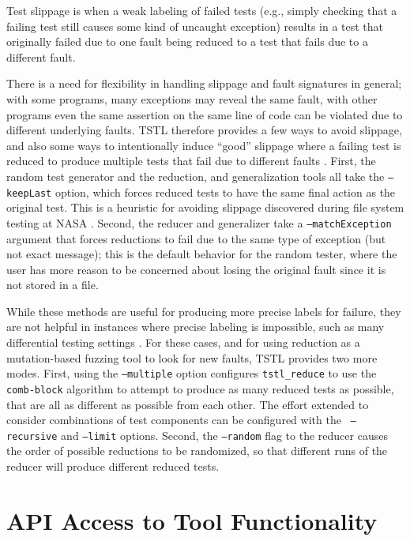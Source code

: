 Test slippage \cite{PLDI13,slippage} is when a weak
labeling of failed tests (e.g., simply checking that a failing test
still causes some kind of uncaught exception) results in a test that
originally failed due to one fault being reduced to a test that fails
due to a different fault.

There is a need for flexibility in handling slippage and fault
signatures in general; with some programs, many exceptions may reveal
the same fault, with other programs even the same assertion on the
same line of code can be violated due to different underlying faults.
TSTL therefore provides a few ways to avoid slippage, and also some ways to 
intentionally induce ``good'' slippage where a failing test is reduced 
to produce multiple tests that fail due to different faults 
\cite{slippage}.  First, the random test generator and the reduction,
and generalization tools all take the {\tt --keepLast}
option, which forces reduced tests to have the same final action as
the original test.  This is a heuristic for avoiding slippage
discovered during file system testing at NASA \cite{ICSEDiff}.
Second, the reducer and generalizer take a {\tt --matchException}
argument that forces reductions to fail due to the same type of
exception (but not exact message); this is the default behavior for the random
tester, where the user has more reason to be concerned about losing
the original fault since it is not stored in a file.

While these methods are useful for producing more precise labels for
failure, they are not helpful in instances where precise labeling is
impossible, such as many differential testing settings \cite{PLDI13}.
For these cases, and for using reduction as a mutation-based fuzzing
tool to look for new faults, TSTL provides two more modes.  First,
using the {\tt --multiple} option configures {\tt tstl\_reduce} to use
the {\tt comb-block} algorithm \cite{slippage} to attempt to produce
as many reduced tests as possible, that are all as different as
possible from each other.  The effort extended to consider
combinations of test components can be configured with the {\tt
  --recursive} and {\tt --limit} options.  Second, the {\tt --random}
flag to the reducer causes the order of possible reductions to be
randomized, so that different runs of the reducer will produce
different reduced tests.

\section{API Access to Tool Functionality}

